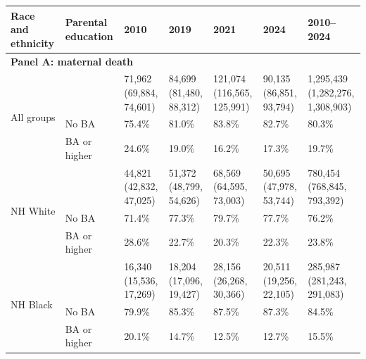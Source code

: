 \begin{threeparttable}
\begin{tabular}{lllllll}
\toprule
Race and ethnicity & Parental education & 2010 & 2019 & 2021 & 2024 & 2010--2024 \\
\midrule
\multicolumn{7}{l}{\textbf{Panel A: maternal death}} \\
\multirow{3}{*}{All groups} & \raisebox{0.5\height}{\textbf{Total}} & \shortstack[l]{71,962 \\ (69,884, 74,601)} & \shortstack[l]{84,699 \\ (81,480, 88,312)} & \shortstack[l]{121,074 \\ (116,565, 125,991)} & \shortstack[l]{90,135 \\ (86,851, 93,794)} & \shortstack[l]{1,295,439 \\ (1,282,276, 1,308,903)} \\
\cmidrule(lr){2-7}
 & No BA & 75.4\% & 81.0\% & 83.8\% & 82.7\% & 80.3\% \\
 & BA or higher & 24.6\% & 19.0\% & 16.2\% & 17.3\% & 19.7\% \\
\cmidrule(lr){1-7}
\multirow{3}{*}{NH White} & \raisebox{0.5\height}{\textbf{Total}} & \shortstack[l]{44,821 \\ (42,832, 47,025)} & \shortstack[l]{51,372 \\ (48,799, 54,626)} & \shortstack[l]{68,569 \\ (64,595, 73,003)} & \shortstack[l]{50,695 \\ (47,978, 53,744)} & \shortstack[l]{780,454 \\ (768,845, 793,392)} \\
\cmidrule(lr){2-7}
 & No BA & 71.4\% & 77.3\% & 79.7\% & 77.7\% & 76.2\% \\
 & BA or higher & 28.6\% & 22.7\% & 20.3\% & 22.3\% & 23.8\% \\
\cmidrule(lr){1-7}
\multirow{3}{*}{NH Black} & \raisebox{0.5\height}{\textbf{Total}} & \shortstack[l]{16,340 \\ (15,536, 17,269)} & \shortstack[l]{18,204 \\ (17,096, 19,427)} & \shortstack[l]{28,156 \\ (26,268, 30,366)} & \shortstack[l]{20,511 \\ (19,256, 22,105)} & \shortstack[l]{285,987 \\ (281,243, 291,083)} \\
\cmidrule(lr){2-7}
 & No BA & 79.9\% & 85.3\% & 87.5\% & 87.3\% & 84.5\% \\
 & BA or higher & 20.1\% & 14.7\% & 12.5\% & 12.7\% & 15.5\% \\

\end{tabular}
\end{threeparttable}
